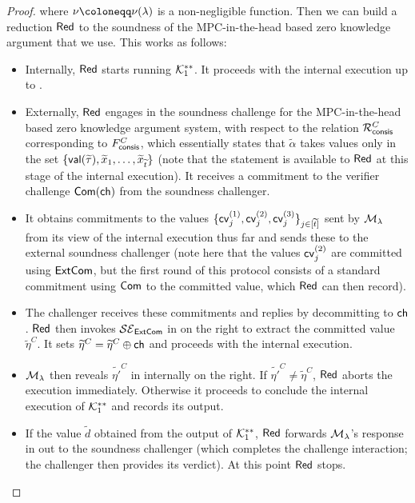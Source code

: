 \begin{proof}
where $\nu \coloneqq \nu(\secpar)$ is a non-negligible function. Then we can build a reduction $\mathsf{Red}$ to the soundness of the MPC-in-the-head based zero knowledge argument that we use. This works as follows: 
\begin{itemize}
    \item Internally, $\mathsf{Red}$ starts running $\mathcal{K}_1^{**}$. It proceeds with the internal execution up to . 
    \item Externally, $\mathsf{Red}$ engages in the soundness challenge for the MPC-in-the-head based zero knowledge argument system, with respect to the relation $\mathcal{R}^C_\mathsf{consis}$ corresponding to $F^C_\mathsf{consis}$, which essentially states that $\tilde{\alpha}$ takes values only in the set $\{\mathsf{val}(\widetilde{\tau}),\widetilde{x}_1,\dots,\widetilde{x}_{\widetilde{t}}\}$ (note that the statement is available to $\mathsf{Red}$ at this stage of the internal execution). It receives a commitment to the verifier challenge $\mathsf{Com}(\mathsf{ch})$ from the soundness challenger. 
    \item It obtains commitments to the values $\{\mathsf{cv}^{(1)}_j,\mathsf{cv}^{(2)}_j,\mathsf{cv}^{(3)}_j\}_{j \in [\widetilde{t}]}$ sent by $\mathcal{M}_\lambda$ from its view of the internal execution thus far and sends these to the external soundness challenger (note here that the values $\mathsf{cv}^{(2)}_j$ are committed using $\mathsf{ExtCom}$, but the first round of this protocol consists of a standard commitment using $\mathsf{Com}$ to the committed value, which $\mathsf{Red}$ can then record). 
    \item The challenger receives these commitments and replies by decommitting to $\mathsf{ch}$. $\mathsf{Red}$ then invokes $\mathcal{SE}_\mathsf{ExtCom}$ in  on the right to extract the committed value $\tilde{\eta}^C$. It sets $\widetilde{\eta}^C = \widetilde{\eta}^C \oplus \mathsf{ch}$ and proceeds with the internal execution. 
    \item $\mathcal{M}_\lambda$ then reveals $\tilde{\eta'}^{C}$ in  internally on the right. If $\tilde{\eta'}^{C} \neq \tilde{\eta}^{C}$, $\mathsf{Red}$ aborts the execution immediately. Otherwise it proceeds to conclude the internal execution of $\mathcal{K}_1^{**}$ and records its output. 
    \item If the value $\tilde{d}$ obtained from the output of $\mathcal{K}_1^{**}$, $\mathsf{Red}$ forwards $\mathcal{M}_\lambda$'s response in  out to the soundness challenger (which completes the challenge interaction; the challenger then provides its verdict). At this point $\mathsf{Red}$ stops.   
\end{itemize}



\end{proof}

